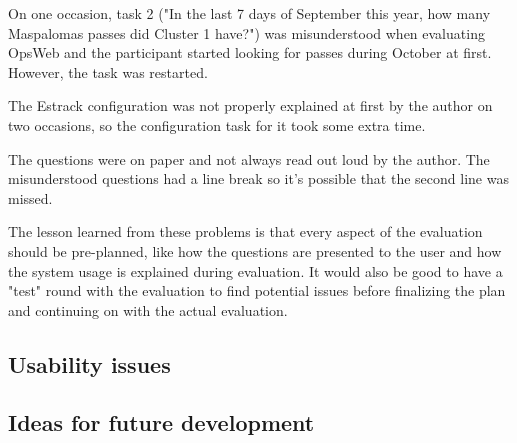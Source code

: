 On one occasion, task 2 ("In the last 7 days of September this year, how many Maspalomas passes did Cluster 1 have?") was misunderstood when evaluating OpsWeb and the participant started looking for passes during October at first. However, the task was restarted.

The Estrack configuration was not properly explained at first by the author on two occasions, so the configuration task for it took some extra time.

The questions were on paper and not always read out loud by the author. The misunderstood questions had a line break so it's possible that the second line was missed. 

The lesson learned from these problems is that every aspect of the evaluation should be pre-planned, like how the questions are presented to the user and how the system usage is explained during evaluation. It would also be good to have a "test" round with the evaluation to find potential issues before finalizing the plan and continuing on with the actual evaluation.

\subsection{Usability issues} \label{usability_issues}

\subsection{Ideas for future development}